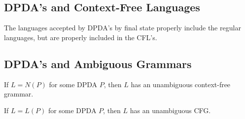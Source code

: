\documentclass[]{article}
\begin{document}
  \subsection*{DPDA's and Context-Free Languages}
    The languages accepted by DPDA's by final state properly include the regular
    languages, but are properly included in the CFL's.

  \subsection*{DPDA's and Ambiguous Grammars}
    \begin{thm}
      If $L = N(P)$ for some DPDA $P$, then $L$ has an unambiguous context-free
      grammar.
    \end{thm}
    \begin{thm}
      If $L = L(P)$ for some DPDA $P$, then $L$ has an unambiguous CFG.
    \end{thm}
\end{document}
